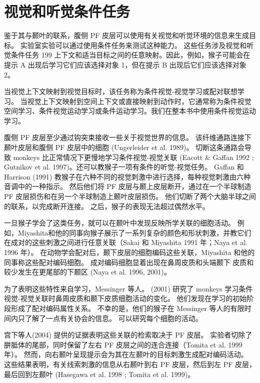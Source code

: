 \section{视觉和听觉条件任务}
\par
鉴于其与颞叶的联系，腹侧 PF 皮层可以使用有关视觉和听觉环境的信息来生成目标。 实验室实验可以通过使用条件任务来测试这种能力。 这些任务涉及视觉和听觉条件任务 199 上下文和适当目标之间的任意映射。因此，例如，猴子可能会在提示 A 出现后学习它们应该选择对象 1，但在提示 B 出现后它们应该选择对象 2。
\par
当视觉上下文映射到视觉目标时，该任务称为条件视觉-视觉学习或配对联想学习。 当视觉上下文映射到空间上下文或直接映射到动作时，它通常称为条件视觉空间学习、条件视觉运动学习或条件运动学习。我们在整本书中使用条件视觉运动学习。
\par
腹侧 PF 皮层至少通过钩突束接收一些关于视觉世界的信息。 该纤维通路连接下颞叶皮层和腹侧 PF 皮层中的细胞 (Ungerleider et al. 1989)。 切断这条通路会导致 monkeys 比正常情况下更慢地学习条件视觉-视觉关联 (Eacott \& Gaffan 1992 ; Gutnikov et al. 1997)。还可以教猴子一项有条件的听觉-视觉任务。 Gaffan 和 Harrison (1991) 教猴子在六种不同的视觉刺激中进行选择，每种视觉刺激由六种音调中的一种指示。 然后他们将 PF 皮层与颞上皮层断开，通过在一个半球制造 PF 皮层损伤和在另一个半球制造上颞叶皮层损伤。 他们切断了两个大脑半球之间的联系，以完成断开连接。 之后，猴子的表现无法超过偶然水平。
\par
一旦猴子学会了这类任务，就可以在颞叶中发现反映所学关联的细胞活动。 例如，Miyashita和他的同事向猴子展示了一系列复杂的颜色和形状刺激，并教它们在成对的这些刺激之间进行任意关联（Sakai 和 Miyashita 1991 年；Naya et al. 1996 年）。 在动物学会配对后，颞下皮层的细胞编码这些关联，Miyashita 和他的同事称这些配对编码细胞。 成对编码细胞显着出现在鼻周皮质和头端颞下
皮质和较少发生在更尾部的下颞区 (Naya et al. 1996, 2001)。
\par
为了表明这些特性来自学习，Messinger 等人。 (2001) 研究了 monkeys 学习条件视觉-视觉关联时鼻周皮质和颞下皮质细胞活动的变化。 他们发现在学习的初始阶段形成了配对编码属性关系。 不幸的是，他们的猴子在 Messinger 等人的有限时间内只了解了一点有关协会的信息。 可以研究每个细胞的活动。
\par
宫下等人(2004) 提供的证据表明这些关联的检索取决于 PF 皮层。 实验者切除了胼胝体的尾部，同时保留了左右 PF 皮层之间的连合连接（Tomita et al. 1999 年）。 然而，向右颞叶呈现提示会为其在左颞叶的目标刺激生成配对编码活动。 这些结果表明，有关线索刺激的信息从右颞叶到右 PF 皮层，然后到左 PF 皮层，最后回到左颞叶 (Hasegawa et al. 1998 ; Tomita et al. 1999)。
\par
